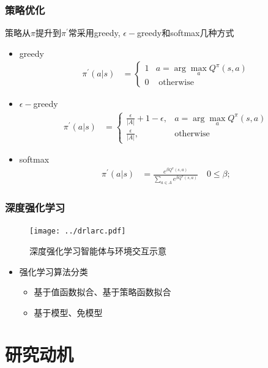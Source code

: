 \documentclass{beamer}
\begin{document}
\begin{CJK*}{GBK}{hei}
\begin{frame}\frametitle{策略优化}
策略从$\pi$提升到$\pi^{\prime}$常采用greedy, $\epsilon-$greedy和softmax几种方式
\begin{itemize}
    \item greedy
    \begin{align*}
    \pi^{\prime}(a | s)&=\left\{
        \begin{array}{ll}
            1 &  a=\arg \max _{a} Q^{\pi}(s, a) \\
            0 & \text { otherwise }
        \end{array}\right.
    \end{align*}
    \item $\epsilon-$greedy
    \begin{align*}
        \pi^{\prime}(a | s)&=\left\{\begin{array}{ll}
        \frac{\epsilon}{|A|}+1-\epsilon, & a=\arg \max _{a} Q^{\pi}(s, a) \\
        \frac{\epsilon}{|A|}, & \text {otherwise}
        \end{array}\right.
    \end{align*}
    \item softmax
    \begin{align*}
        \pi^{\prime}(a | s)&=\frac{e^{\beta {Q^{\pi}(s,a)}}}{\sum_{a\in A} e^{{\beta Q^{\pi}(s,a)}}}\quad 0 \leq \beta;
    \end{align*}
\end{itemize}
\end{frame}

\begin{frame}\frametitle{深度强化学习}
    \begin{figure}[htbp]
       \centering\texttt{[image: ../drlarc.pdf]}
	   \caption{深度强化学习智能体与环境交互示意}
    \end{figure}
\begin{itemize}
\item 强化学习算法分类
{
\begin{itemize}
\item 基于值函数拟合、基于策略函数拟合
\item 基于模型、免模型
\end{itemize}
}
\end{itemize}
\end{frame}

\section{研究动机}


\end{CJK*}
\end{document}
